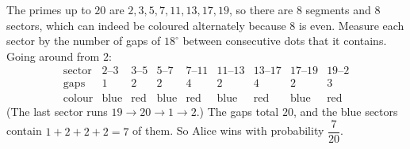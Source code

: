 The primes up to $20$ are $2,3,5,7,11,13,17,19$, so there are $8$ segments and $8$ sectors, which can indeed be coloured alternately because $8$ is even. Measure each sector by the number of gaps of $18^\circ$ between consecutive dots that it contains. Going around from $2$:
\[\begin{array}{c|cccccccc}
\text{sector}&2\text{--}3&3\text{--}5&5\text{--}7&7\text{--}11&11\text{--}13&13\text{--}17&17\text{--}19&19\text{--}2\\\hline
\text{gaps}&1&2&2&4&2&4&2&3\\
\text{colour}&\text{blue}&\text{red}&\text{blue}&\text{red}&\text{blue}&\text{red}&\text{blue}&\text{red}
\end{array}\]
(The last sector runs $19\to20\to1\to2$.) The gaps total $20$, and the blue sectors contain $1+2+2+2=7$ of them. So Alice wins with probability $\boxed{\dfrac{7}{20}}$.
